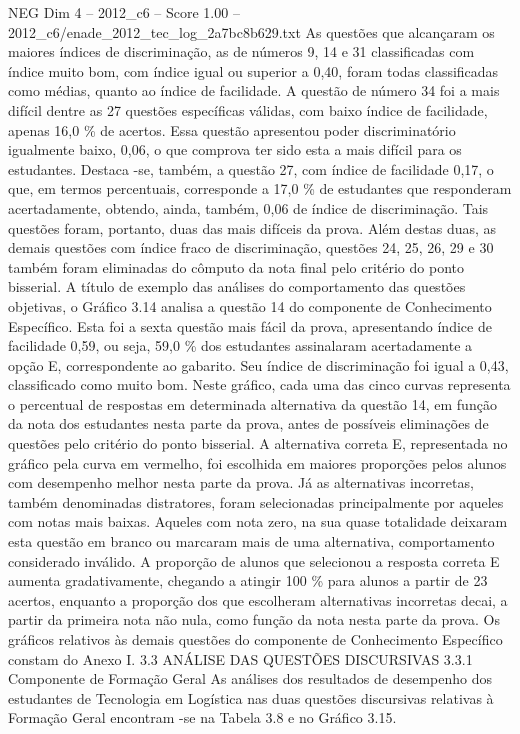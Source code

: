 \begin{textsample}{NEG Dim 4 – 2012\_c6 – Score 1.00 – 2012\_c6/enade\_2012\_tec\_log\_2a7bc8b629.txt}
As questões que alcançaram os maiores índices de discriminação, as de números 9, 14 e 31 classificadas com índice muito bom, com índice igual ou superior a 0,40, foram todas classificadas como médias, quanto ao índice de facilidade.
A questão de número 34 foi a mais difícil dentre as 27 questões específicas válidas, com baixo índice de facilidade, apenas 16,0 \% de acertos.
Essa questão apresentou poder discriminatório igualmente baixo, 0,06, o que comprova ter sido esta a mais difícil para os estudantes.
Destaca -se, também, a questão 27, com índice de facilidade 0,17, o que, em termos percentuais, corresponde a 17,0 \% de estudantes que responderam acertadamente, obtendo, ainda, também, 0,06 de índice de discriminação.
Tais questões foram, portanto, duas das mais difíceis da prova.
Além destas duas, as demais questões com índice fraco de discriminação, questões 24, 25, 26, 29 e 30 também foram eliminadas do cômputo da nota final pelo critério do ponto bisserial.
A título de exemplo das análises do comportamento das questões objetivas, o Gráfico 3.14 analisa a questão 14 do componente de Conhecimento Específico.
Esta foi a sexta questão mais fácil da prova, apresentando índice de facilidade 0,59, ou seja, 59,0 \% dos estudantes assinalaram acertadamente a opção E, correspondente ao gabarito.
Seu índice de discriminação foi igual a 0,43, classificado como muito bom.
Neste gráfico, cada uma das cinco curvas representa o percentual de respostas em determinada alternativa da questão 14, em função da nota dos estudantes nesta parte da prova, antes de possíveis eliminações de questões pelo critério do ponto bisserial.
A alternativa correta E, representada no gráfico pela curva em vermelho, foi escolhida em maiores proporções pelos alunos com desempenho melhor nesta parte da prova.
Já as alternativas incorretas, também denominadas distratores, foram selecionadas principalmente por aqueles com notas mais baixas.
Aqueles com nota zero, na sua quase totalidade deixaram esta questão em branco ou marcaram mais de uma alternativa, comportamento considerado inválido.
A proporção de alunos que selecionou a resposta correta E aumenta gradativamente, chegando a atingir 100 \% para alunos a partir de 23 acertos, enquanto a proporção dos que escolheram alternativas incorretas decai, a partir da primeira nota não nula, como função da nota nesta parte da prova.
Os gráficos relativos às demais questões do componente de Conhecimento Específico constam do Anexo I. 3.3 ANÁLISE DAS QUESTÕES DISCURSIVAS 3.3.1 Componente de Formação Geral As análises dos resultados de desempenho dos estudantes de Tecnologia em Logística nas duas questões discursivas relativas à Formação Geral encontram -se na Tabela 3.8 e no Gráfico 3.15.

\end{textsample}
